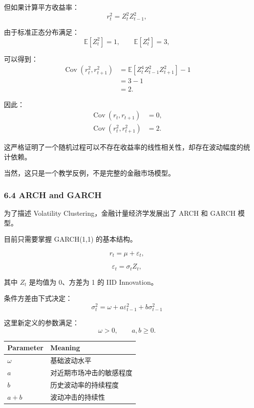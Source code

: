 但如果计算平方收益率：
\[r_t^2=Z_t^2Z_{t-1}^2,\]

由于标准正态分布满足：
\[\mathbb E[Z_t^2]=1,\qquad
\mathbb E[Z_t^4]=3,\]

可以得到：
\[\begin{aligned}
\operatorname{Cov}(r_t^2,r_{t+1}^2)
&=\mathbb E[Z_t^4Z_{t-1}^2Z_{t+1}^2]-1\\
&=3-1\\
&=2.
\end{aligned}\]

因此：
\[\boxed{
\begin{aligned}
\operatorname{Cov}(r_t,r_{t+1})&=0,\\
\operatorname{Cov}(r_t^2,r_{t+1}^2)&=2.
\end{aligned}
}\]

这严格证明了一个随机过程可以不存在收益率的线性相关性，却存在波动幅度的统计依赖。

当然，这只是一个教学反例，不是完整的金融市场模型。

\hypertarget{part-4-52-0680-arch-and-garch}{%
\subsubsection{6.4 ARCH and GARCH}\label{part-4-52-0680-arch-and-garch}}

为了描述 Volatility Clustering，金融计量经济学发展出了 ARCH 和 GARCH 模型。

目前只需要掌握 GARCH(1,1) 的基本结构。

\[r_t=\mu+\varepsilon_t,\]

\[\varepsilon_t=\sigma_tZ_t,\]

其中 \(Z_t\) 是均值为 0、方差为 1 的 IID Innovation。

条件方差由下式决定：
\[\boxed{
\sigma_t^2
=
\omega
+a\varepsilon_{t-1}^2
+b\sigma_{t-1}^2
}\]

这里新定义的参数满足：
\[\omega>0,\qquad a,b\geq0.\]

\begin{readertable}
\begin{longtable}[]{@{}
  >{\raggedright\arraybackslash}p{}
  >{\raggedright\arraybackslash}p{}@{}}
\toprule
Parameter & Meaning \\
\midrule
\endhead
\(\omega\) & 基础波动水平 \\
\(a\) & 对近期市场冲击的敏感程度 \\
\(b\) & 历史波动率的持续程度 \\
\(a+b\) & 波动冲击的持续性 \\
\bottomrule
\end{longtable}
\end{readertable}


